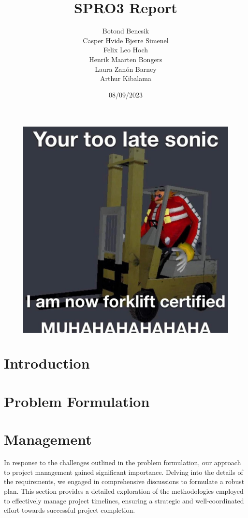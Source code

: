 \documentclass[11pt,table]{article}
\title{SPRO3 Report}
\date{08/09/2023}
\author{Botond Bencsik\\Casper Hvide Bjerre Simenel\\Felix Leo Hoch\\Henrik Maarten Bongers\\Laura Zanón Barney\\Arthur Kibalama}
\begin{document}
\maketitle
\begin{figure}[H]
    \includegraphics[width=\textwidth]{forklift_m.jpg}
\end{figure}
\newpage
\tableofcontents
\newpage
\section{Introduction}
      
\section{Problem Formulation}
    
    
    

    
    
\section{Management}
    In response to the challenges outlined in the problem formulation, our approach
    to project management gained significant importance. Delving into the details
    of the requirements, we engaged in comprehensive discussions to formulate a
    robust plan. This section provides a detailed exploration of the methodologies
    employed to effectively manage project timelines, ensuring a strategic and
    well-coordinated effort towards successful project completion.
    
    
    
    
    
\end{document}

